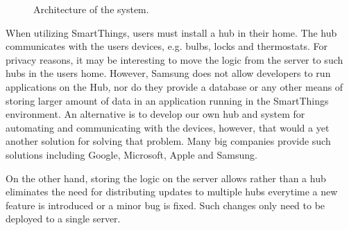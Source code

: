 \begin{figure}[h]
  \centering
  \caption{Architecture of the system.}
  \label{fig:architecture}
\end{figure}

When utilizing SmartThings, users must install a hub in their home. The hub communicates with the users devices, e.g. bulbs, locks and thermostats. For privacy reasons, it may be interesting to move the logic from the server to such hubs in the users home. However, Samsung does not allow developers to run applications on the Hub, nor do they provide a database or any other means of storing larger amount of data in an application running in the SmartThings environment.
An alternative is to develop our own hub and system for automating and communicating with the devices, however, that would a yet another solution for solving that problem. Many big companies provide such solutions including Google, Microsoft, Apple and Samsung.

On the other hand, storing the logic on the server allows rather than a hub eliminates the need for distributing updates to multiple hubs everytime a new feature is introduced or a minor bug is fixed. Such changes only need to be deployed to a single server.

